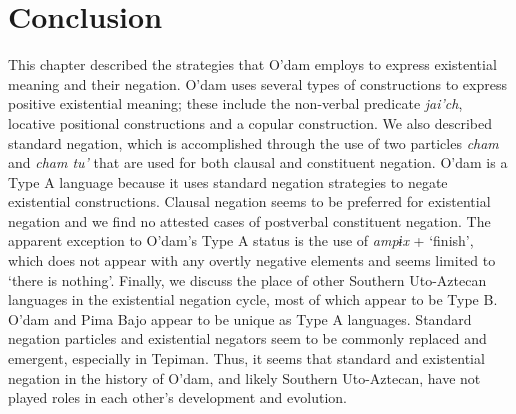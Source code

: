 \documentclass[output=paper,draft,draftmode,colorlinks,citecolor=brown]{langscibook}
\begin{document}
\section{Conclusion}
This chapter described the strategies that O’dam employs to express existential meaning and their negation. O’dam uses several types of constructions to express positive existential meaning; these include the non-verbal predicate \emph{jai’ch}, locative positional constructions and a copular construction. We also described standard negation, which is accomplished through the use of two particles \emph{cham} and \emph{cham tu’} that are used for both clausal and constituent negation. O’dam is a Type A language because it uses standard negation strategies to negate existential constructions. Clausal negation seems to be preferred for existential negation and we find no attested cases of postverbal constituent negation. The apparent exception to O’dam’s Type A status is the use of \emph{ampɨx} + ‘finish’, which does not appear with any overtly negative elements and seems limited to ‘there is nothing’. Finally, we discuss the place of other Southern Uto-Aztecan languages in the existential negation cycle, most of which appear to be Type B. O’dam and Pima Bajo appear to be unique as Type A languages. Standard negation particles and existential negators seem to be commonly replaced and emergent, especially in Tepiman. Thus, it seems that standard and existential negation in the history of O'dam, and likely Southern Uto-Aztecan, have not played roles in each other's development and evolution.
\end{document}

